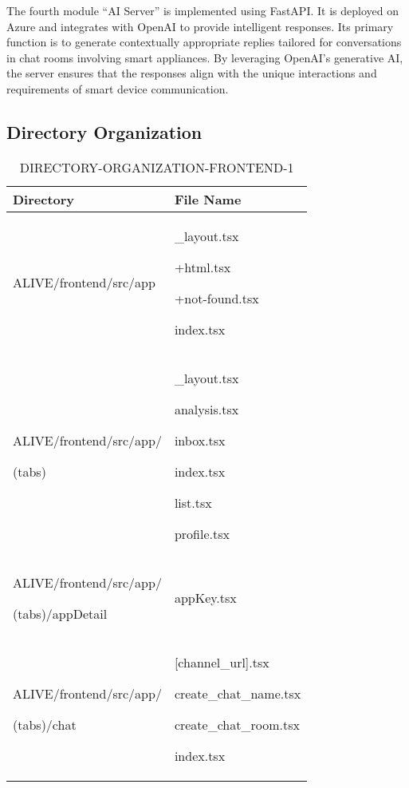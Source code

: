 \documentclass[conference]{IEEEtran}
\begin{document}
\hspace{0.7em} The fourth module “AI Server” is implemented using FastAPI. It is deployed on Azure and integrates with OpenAI to provide intelligent responses. Its primary function is to generate contextually appropriate replies tailored for conversations in chat rooms involving smart appliances. By leveraging OpenAI's generative AI, the server ensures that the responses align with the unique interactions and requirements of smart device communication.

\subsection{Directory Organization}

\begin{table}[h]
\caption{DIRECTORY-ORGANIZATION-FRONTEND-1}
\def\arraystretch{1.24} \small
    \begin{tabular}{|p{3.7cm}|p{4.1cm}|}
\hline
        Directory & File Name \\ \hline
          ALIVE/frontend/src/app  & \_layout.tsx \par +html.tsx \par +not-found.tsx \par index.tsx 
          \\ \hline
          
          ALIVE/frontend/src/app/ \par (tabs) \par  & \_layout.tsx \par analysis.tsx \par inbox.tsx \par index.tsx \par list.tsx \par profile.tsx
          \\ \hline
          
          ALIVE/frontend/src/app/ \par (tabs)/appDetail \par  & appKey.tsx
          \\ \hline
          
          ALIVE/frontend/src/app/ \par (tabs)/chat \par  & [channel\_url].tsx \par create\_chat\_name.tsx \par create\_chat\_room.tsx \par index.tsx
          \\ \hline
          

\end{tabular}
\end{table}
\end{document}
